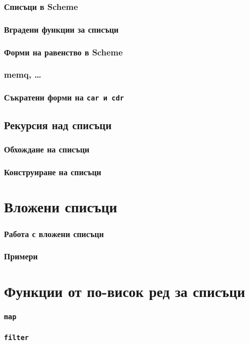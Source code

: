 \documentclass{beamer}
\begin{document}
\begin{frame}
  \frametitle{Списъци в Scheme}
\end{frame}

\begin{frame}
  \frametitle{Вградени функции за списъци}
\end{frame}

\begin{frame}
  \frametitle{Форми на равенство в Scheme}
\end{frame}

\begin{frame}
  \frametitle{memq, \ldots}
\end{frame}

\begin{frame}
  \frametitle{Съкратени форми на \tt{car} и \tt{cdr}}
\end{frame}


\subsection{Рекурсия над списъци}


\begin{frame}
  \frametitle{Обхождане на списъци}
\end{frame}

\begin{frame}
  \frametitle{Конструиране на списъци}
\end{frame}

\section{Вложени списъци}

\begin{frame}
  \frametitle{Работа с вложени списъци}
\end{frame}

\begin{frame}
  \frametitle{Примери}
\end{frame}

\section{Функции от по-висок ред за списъци}

\begin{frame}
  \frametitle{\tt{map}}
\end{frame}

\begin{frame}
  \frametitle{\tt{filter}}
\end{frame}
\end{document}
